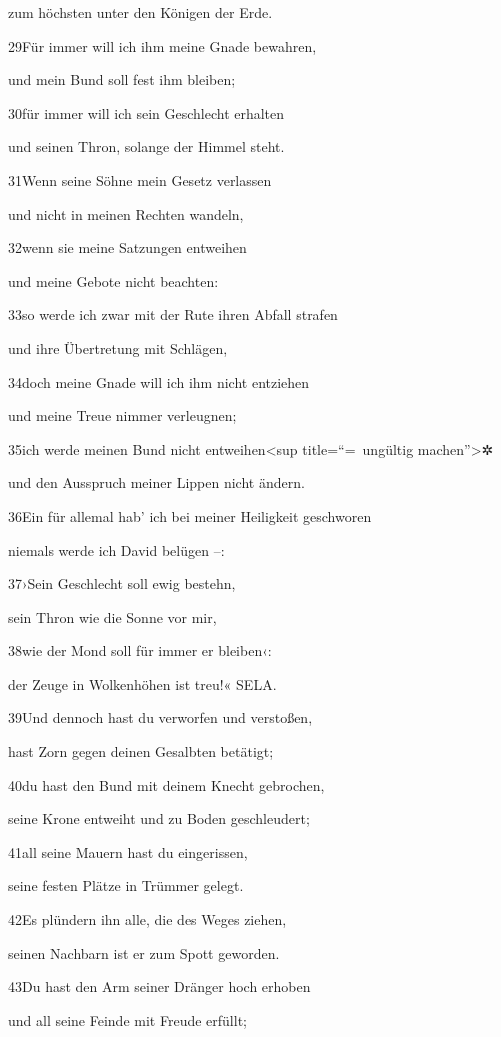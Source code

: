 zum höchsten unter den Königen der Erde.

29Für immer will ich ihm meine Gnade bewahren,

und mein Bund soll fest ihm bleiben;

30für immer will ich sein Geschlecht erhalten

und seinen Thron, solange der Himmel steht.

31Wenn seine Söhne mein Gesetz verlassen

und nicht in meinen Rechten wandeln,

32wenn sie meine Satzungen entweihen

und meine Gebote nicht beachten:

33so werde ich zwar mit der Rute ihren Abfall strafen

und ihre Übertretung mit Schlägen,

34doch meine Gnade will ich ihm nicht entziehen

und meine Treue nimmer verleugnen;

35ich werde meinen Bund nicht entweihen\textless sup title=``=~ungültig
machen''\textgreater✲

und den Ausspruch meiner Lippen nicht ändern.

36Ein für allemal hab' ich bei meiner Heiligkeit geschworen

niemals werde ich David belügen --:

37›Sein Geschlecht soll ewig bestehn,

sein Thron wie die Sonne vor mir,

38wie der Mond soll für immer er bleiben‹:

der Zeuge in Wolkenhöhen ist treu!« SELA.

39Und dennoch hast du verworfen und verstoßen,

hast Zorn gegen deinen Gesalbten betätigt;

40du hast den Bund mit deinem Knecht gebrochen,

seine Krone entweiht und zu Boden geschleudert;

41all seine Mauern hast du eingerissen,

seine festen Plätze in Trümmer gelegt.

42Es plündern ihn alle, die des Weges ziehen,

seinen Nachbarn ist er zum Spott geworden.

43Du hast den Arm seiner Dränger hoch erhoben

und all seine Feinde mit Freude erfüllt;

